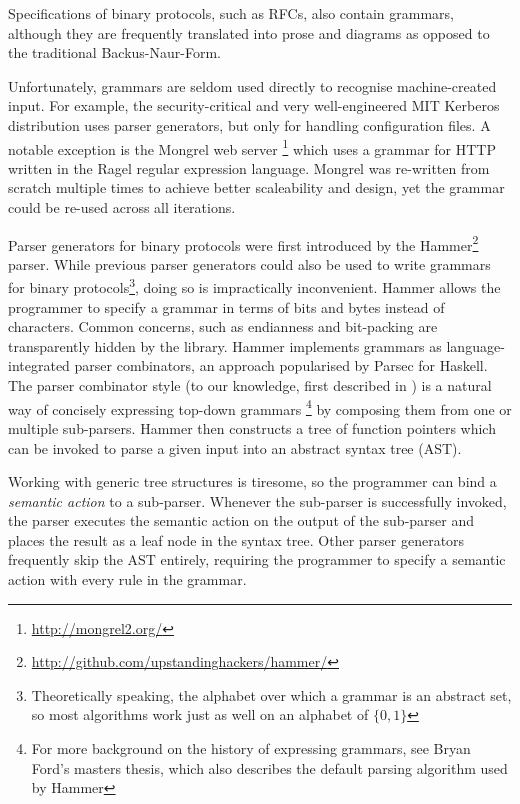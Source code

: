 Specifications of binary protocols, such as RFCs, also contain grammars, although they are
frequently translated into prose and diagrams as opposed to the traditional Backus-Naur-Form.  


Unfortunately, grammars are seldom used directly to recognise machine-created input. For example,
the security-critical and very well-engineered MIT Kerberos distribution uses parser
generators, but only for handling configuration files. A notable exception is the Mongrel
web server \footnote{\url{http://mongrel2.org/}} which uses a grammar for HTTP written in the
Ragel \cite{ragel-paper} regular expression language. Mongrel was re-written from scratch multiple
times to achieve better scaleability and design, yet the grammar could be  re-used across all iterations\cite{patterson-citation}.

 Parser generators for binary protocols were first introduced by the Hammer\footnote{\url{http://github.com/upstandinghackers/hammer/}} parser.
 While previous parser generators could also be used to write grammars for binary
 protocols\footnote{Theoretically speaking, the alphabet over which a grammar is an  abstract set,
   so most algorithms work just as well on an alphabet of $\{0,1\}$}, doing so is impractically
 inconvenient. Hammer allows the programmer to specify a grammar in terms of bits and bytes instead
 of characters. Common concerns, such as endianness and bit-packing are transparently hidden by the
 library. Hammer implements grammars as language-integrated parser combinators, an approach
 popularised by Parsec for Haskell\cite{LeijenMeijer:parsec}. The parser combinator style (to our
 knowledge, first  described in \cite{burge1975recursive}) is a natural way of concisely expressing
 top-down grammars\cite{Danielsson:2010:TPC:1863543.1863585} \footnote{For more background on the history of expressing grammars, see Bryan
   Ford's masters thesis\cite{ford2002packrat}, which also describes the default parsing algorithm used by Hammer} by composing them from one or multiple sub-parsers. 
  Hammer then constructs a tree of function pointers which
 can be invoked to parse a given input into an abstract syntax tree (AST).
 
Working with generic tree structures is tiresome, so the programmer can bind a \textit{semantic action} to a
sub-parser. Whenever the sub-parser is successfully invoked, the parser executes the semantic action
on the output of the sub-parser and places the result as a leaf node in the syntax tree. Other
parser generators frequently skip the AST entirely, requiring the programmer to specify a semantic
action with every rule in the grammar. 

